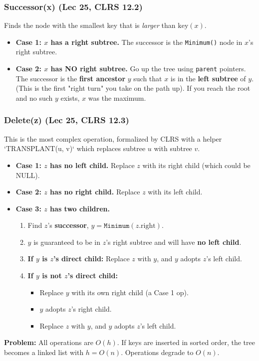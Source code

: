 \subsubsection{Successor(x) (Lec 25, CLRS 12.2)}
Finds the node with the smallest key that is \textit{larger} than $\text{key}(x)$.
\begin{itemize}
    \item \textbf{Case 1: $x$ has a right subtree.}
    The successor is the \texttt{Minimum()} node in $x$'s right subtree.
    \item \textbf{Case 2: $x$ has NO right subtree.}
    Go up the tree using \texttt{parent} pointers. The successor is the \textbf{first ancestor} $y$ such that $x$ is in the \textbf{left subtree} of $y$. (This is the first "right turn" you take on the path up). If you reach the root and no such $y$ exists, $x$ was the maximum.
\end{itemize}

\subsubsection{Delete(z) (Lec 25, CLRS 12.3)}
This is the most complex operation, formalized by CLRS with a helper `TRANSPLANT(u, v)` which replaces subtree $u$ with subtree $v$.
\begin{itemize}
    \item \textbf{Case 1: $z$ has no left child.}
    Replace $z$ with its right child (which could be NULL).
    \item \textbf{Case 2: $z$ has no right child.}
    Replace $z$ with its left child.
    \item \textbf{Case 3: $z$ has two children.}
    \begin{enumerate}
        \item Find $z$'s \textbf{successor}, $y = \texttt{Minimum}(z.\text{right})$.
        \item $y$ is guaranteed to be in $z$'s right subtree and will have \textbf{no left child}.
        \item \textbf{If $y$ is $z$'s direct child:} Replace $z$ with $y$, and $y$ adopts $z$'s left child.
        \item \textbf{If $y$ is not $z$'s direct child:}
        \begin{itemize}
            \item Replace $y$ with its own right child (a Case 1 op).
            \item $y$ adopts $z$'s right child.
            \item Replace $z$ with $y$, and $y$ adopts $z$'s left child.
        \end{itemize}
    \end{enumerate}
\end{itemize}
\textbf{Problem:} All operations are $O(h)$. If keys are inserted in sorted order, the tree becomes a linked list with $h=O(n)$. Operations degrade to $O(n)$.

